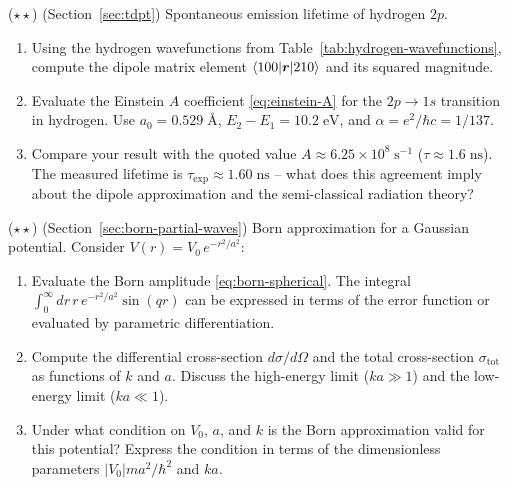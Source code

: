 \begin{problemset}
\item ($\star\star$) (Section~\ref{sec:tdpt}) Spontaneous emission lifetime of hydrogen $2p$.
\begin{enumerate}
\item[(a)] Using the hydrogen wavefunctions from Table~\ref{tab:hydrogen-wavefunctions}, compute the dipole matrix element $\braket{100|\bm r|210}$ and its squared magnitude.
\item[(b)] Evaluate the Einstein $A$ coefficient \eqref{eq:einstein-A} for the $2p\to 1s$ transition in hydrogen. Use $a_{0} = 0.529\;\text{\AA}$, $E_{2}-E_{1} = 10.2\;\text{eV}$, and $\alpha = e^{2}/\hbar c = 1/137$.
\item[(c)] Compare your result with the quoted value $A \approx 6.25 \times 10^{8}\;\text{s}^{-1}$ ($\tau \approx 1.6\;\text{ns}$). The measured lifetime is $\tau_{\text{exp}} \approx 1.60\;\text{ns}$ -- what does this agreement imply about the dipole approximation and the semi-classical radiation theory?
\end{enumerate}

\item ($\star\star$) (Section~\ref{sec:born-partial-waves}) Born approximation for a Gaussian potential. Consider $V(r) = V_{0}\,e^{-r^{2}/a^{2}}$:
\begin{enumerate}
\item[(a)] Evaluate the Born amplitude \eqref{eq:born-spherical}. The integral $\int_{0}^{\infty} dr\,r\,e^{-r^{2}/a^{2}}\sin(qr)$ can be expressed in terms of the error function or evaluated by parametric differentiation.
\item[(b)] Compute the differential cross-section $d\sigma/d\Omega$ and the total cross-section $\sigma_{\text{tot}}$ as functions of $k$ and $a$. Discuss the high-energy limit ($ka \gg 1$) and the low-energy limit ($ka \ll 1$).
\item[(c)] Under what condition on $V_{0}$, $a$, and $k$ is the Born approximation valid for this potential? Express the condition in terms of the dimensionless parameters $|V_{0}|ma^{2}/\hbar^{2}$ and $ka$.
\end{enumerate}


\end{problemset}
